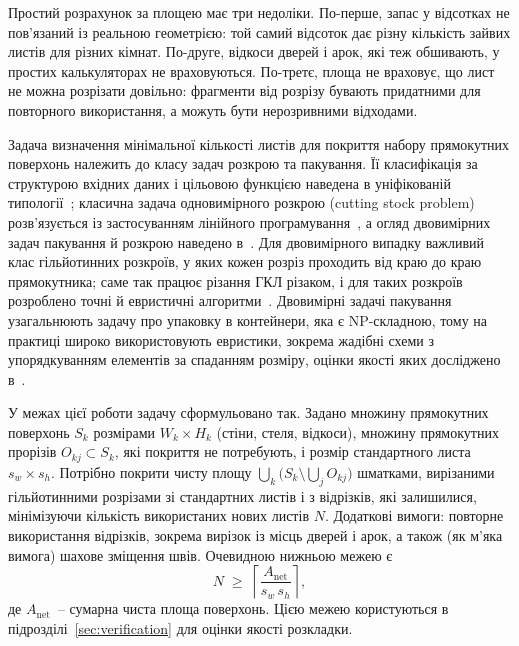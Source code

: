 Простий розрахунок за площею має три недоліки. По-перше, запас у відсотках не пов'язаний із реальною геометрією: той самий відсоток дає різну кількість зайвих листів для різних кімнат. По-друге, відкоси дверей і арок, які теж обшивають, у простих калькуляторах не враховуються. По-третє, площа не враховує, що лист не можна розрізати довільно: фрагменти від розрізу бувають придатними для повторного використання, а можуть бути нерозривними відходами.


Задача визначення мінімальної кількості листів для покриття набору прямокутних поверхонь належить до класу задач розкрою та пакування. Її класифікація за структурою вхідних даних і цільовою функцією наведена в уніфікованій типології~; класична задача одновимірного розкрою (cutting stock problem) розв'язується із застосуванням лінійного програмування~, а огляд двовимірних задач пакування й розкрою наведено в~. Для двовимірного випадку важливий клас гільйотинних розкроїв, у яких кожен розріз проходить від краю до краю прямокутника; саме так працює різання ГКЛ різаком, і для таких розкроїв розроблено точні й евристичні алгоритми~. Двовимірні задачі пакування узагальнюють задачу про упаковку в контейнери, яка є NP-складною, тому на практиці широко використовують евристики, зокрема жадібні схеми з упорядкуванням елементів за спаданням розміру, оцінки якості яких досліджено в~.

У межах цієї роботи задачу сформульовано так. Задано множину прямокутних поверхонь $S_k$ розмірами $W_k\times H_k$ (стіни, стеля, відкоси), множину прямокутних прорізів $O_{kj}\subset S_k$, які покриття не потребують, і розмір стандартного листа $s_w\times s_h$. Потрібно покрити чисту площу $\bigcup_k\bigl(S_k\setminus\bigcup_j O_{kj}\bigr)$ шматками, вирізаними гільйотинними розрізами зі стандартних листів і з відрізків, які залишилися, мінімізуючи кількість використаних нових листів $N$. Додаткові вимоги: повторне використання відрізків, зокрема вирізок із місць дверей і арок, а також (як м'яка вимога) шахове зміщення швів. Очевидною нижньою межею є
\begin{equation}\label{eq:lowerbound}
    N \;\ge\; \left\lceil \frac{A_{\mathrm{net}}}{s_w\, s_h} \right\rceil ,
\end{equation}
де $A_{\mathrm{net}}$~-- сумарна чиста площа поверхонь. Цією межею користуються в підрозділі~\ref{sec:verification} для оцінки якості розкладки.

